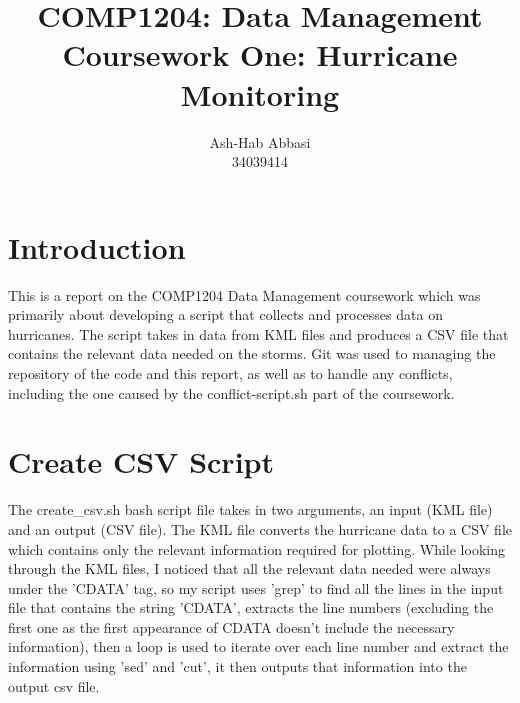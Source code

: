 \documentclass[]{article}
\title{COMP1204: Data Management \\ Coursework One: Hurricane Monitoring }
\author{Ash-Hab Abbasi \\ 34039414}
\begin{document}
\maketitle

\section{Introduction} This is a report on the COMP1204 Data Management coursework which was primarily about developing a script that collects and processes data on hurricanes. The script takes in data from KML files and produces a CSV file that contains the relevant data needed on the storms. Git was used to managing the repository of the code and this report, as well as to handle any conflicts, including the one caused by the conflict-script.sh part of the coursework.

\section{Create CSV Script}
The create\_csv.sh bash script file takes in two arguments, an input (KML file) and an output (CSV file). The KML file converts the hurricane data to a CSV file which contains only the relevant information required for plotting.
While looking through the KML files, I noticed that all the relevant data needed were always under the 'CDATA' tag, so my script uses 'grep' to find all the lines in the input file that contains the string 'CDATA', extracts the line numbers (excluding the first one as the first appearance of CDATA doesn't include the necessary information), then a loop is used to iterate over each line number and extract the information using 'sed' and 'cut', it then outputs that information into the output csv file.
\end{document}
